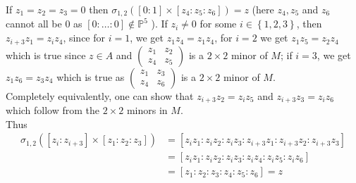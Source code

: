\documentclass[a4paper]{article}
\begin{document}
\linebreak
If $z_1 = z_2 = z_3 = 0$ then
$\sigma_{1,2}\left( 
\left[ 0 : 1 \right]
\times \left[ z_4 : z_5 : z_6 \right]   \right) 
= z $ (here $z_4, z_5 $ and $z_6$ cannot all be $0$ as
$\left[ 0: \ldots : 0 \right] \not\in \mathbb{P}^{5}$ ).
If $z_i \neq 0$ for some $i \in \left\{ 1,2,3 \right\} $, then 
$z_{i+3} z_1 = z_i z_4$, since for $i = 1$, we get
$z_1 z_4 = z_1 z_4$, for $i=2$ we get
$z_1 z_5 = z_2 z_4$ which is true since
 $z \in A$ and $\begin{pmatrix} z_1 & z_2\\ z_4 & z_5 \end{pmatrix} $ is a 
 $2\times 2$ minor of $M$; if
 $i= 3$, we get $z_1 z_6 = z_3 z_4$ which is true as
 $\begin{pmatrix} z_1 & z_3 \\ z_4 & z_6 \end{pmatrix} $ is a 
 $2\times 2$ minor of $M$.\\
 Completely equivalently, one can show that
 $z_{i+3} z_2 = z_i z_5$ and $z_{i+3} z_3 = z_i z_6$ which follow
 from the $2\times 2$ minors in $M$.\\
 Thus
 \begin{align*}
\sigma_{1,2}
\left( \left[ z_i : z_{i+3}  \right] \times 
\left[ z_1 : z_2 : z_3 \right] \right)
&= 
\left[ z_i z_1 : z_i z_2 : z_i z_3 : z_{i+3} z_1 : z_{i+3} z_2 : z_{i+3} z_3
\right] \\
&=\left[ z_i z_1 : z_i z_2 : z_i z_3 : z_i z_4 : z_i z_5 : z_i z_6 \right] \\
&= \left[ z_1 : z_2 : z_3 : z_4 : z_5 : z_6 \right] 
= z 
 \end{align*}
\end{document}
